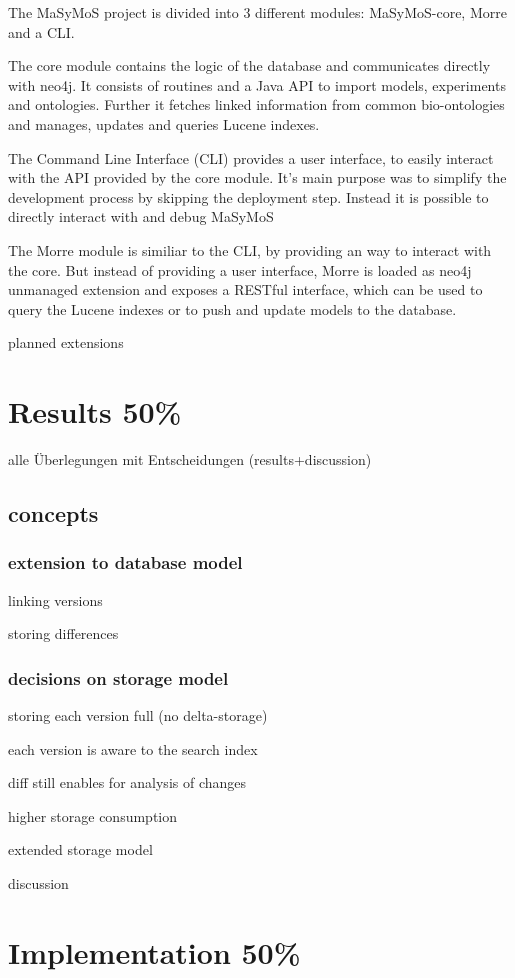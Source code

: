 \par The MaSyMoS project is divided into 3 different modules: MaSyMoS-core, Morre and a CLI.
\par The core module contains the logic of the database and communicates directly with neo4j. It consists of routines and a Java API to import models, experiments and ontologies. Further it fetches linked information from common bio-ontologies and manages, updates and queries Lucene indexes.
\par The Command Line Interface (CLI) provides a user interface, to easily interact with the API provided by the core module. It's main purpose was to simplify the development process by skipping the deployment step. Instead it is possible to directly interact with and debug MaSyMoS
\par The Morre module is similiar to the CLI, by providing an way to interact with the core. But instead of providing a user interface, Morre is loaded as neo4j unmanaged extension and exposes a RESTful interface, which can be used to query the Lucene indexes or to push and update models to the database.
\par planned extensions\section{Results 50\%}

\par alle Überlegungen mit Entscheidungen (results+discussion)\subsection{concepts}
\subsubsection{extension to database model}

\par linking versions
\par storing differences\subsubsection{decisions on storage model}

\par storing each version full (no delta-storage)
\par each version is aware to the search index
\par diff still enables for analysis of changes
\par higher storage consumption
\par extended storage model
\par discussion\section{Implementation 50\%}

